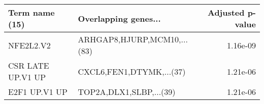 \begin{tabular}{llr}
\toprule
   Term name (15) &        Overlapping genes... &  Adjusted p-value \\
\midrule
        NFE2L2.V2 & ARHGAP8,HJURP,MCM10,...(83) &          1.16e-09 \\
CSR LATE UP.V1 UP &    CXCL6,FEN1,DTYMK,...(37) &          1.21e-06 \\
    E2F1 UP.V1 UP &     TOP2A,DLX1,SLBP,...(39) &          1.21e-06 \\
\bottomrule
\end{tabular}
